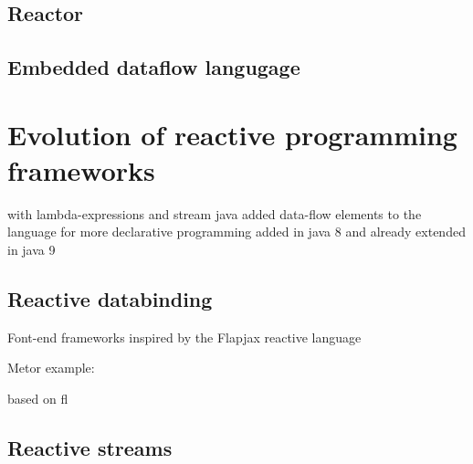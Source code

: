 \documentclass[format=acmtog]{acmart}
\begin{document}
	\subsection{Reactor}

	\subsection{Embedded dataflow langugage}

\section{Evolution of reactive programming frameworks}

	with lambda-expressions and stream java added data-flow elements to the language for more declarative programming
	added in java 8 and already extended in java 9

	\subsection{Reactive databinding}

		Font-end frameworks inspired by the Flapjax reactive language~\cite{Meyerovich:2009}

		Metor example: ~\cite{hochhaus2016meteor}

		based on fl

	\subsection{Reactive streams}



\end{document}
